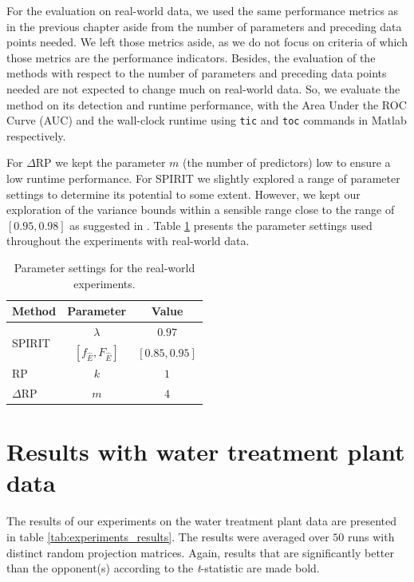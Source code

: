 For the evaluation on real-world data, we used the same performance metrics as in the previous chapter aside from the number of parameters and preceding data points needed. We left those metrics aside, as we do not focus on criteria of which those metrics are the performance indicators. Besides, the evaluation of the methods with respect to the number of parameters and preceding data points needed are not expected to change much on real-world data. So, we evaluate the method on its detection and runtime performance, with the Area Under the ROC Curve (AUC) and the wall-clock runtime using \texttt{tic} and \texttt{toc} commands in Matlab respectively. 

For $\Delta$RP we kept the parameter $m$ (the number of predictors) low to ensure a low runtime performance. For SPIRIT we slightly explored a range of parameter settings to determine its potential to some extent. However, we kept our exploration of the variance bounds within a sensible range close to the range of $[0.95, 0.98]$ as suggested in \cite{papadimitriou2005streaming}. Table \ref{tab:experiments_parameters} presents the parameter settings used throughout the experiments with real-world data.

\begin{table}[h]
	\centering
	\caption{Parameter settings for the real-world experiments.}
	\label{tab:experiments_parameters}
	\begin{tabular}{l c c}
		\toprule	
		\textbf{Method		}					& \textbf{Parameter			}			& \textbf{Value	}	\\
		\midrule
		\multirow{2}{*}{SPIRIT} 	& $\lambda$						&   $0.97$	\\
										& $[f_{\hat{E}}, F_{\hat{E}}]$	&	$[0.85, 0.95]$ \\
		\midrule
		RP				& $k$							&	$1$			\\	
		$\Delta$RP		& $m$							&	$4$			\\	
		\bottomrule		
	\end{tabular}
\end{table}

\section{Results with water treatment plant data}
\label{sec:experiments_results}

The results of our experiments on the water treatment plant data are presented in table \ref{tab:experiments_results}. The results were averaged over $50$ runs with distinct random projection matrices. Again, results that are significantly better than the opponent(s) according to the \textit{t}-statistic are made bold. 

